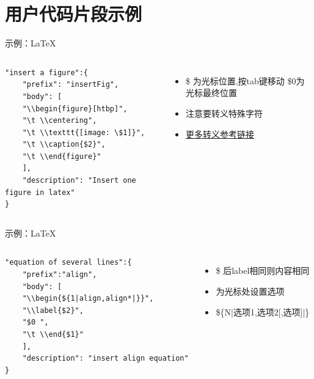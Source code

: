 \documentclass{beamer}
\begin{document}
\section{用户代码片段示例}

\begin{frame}[fragile]{示例：\LaTeX}
    \begin{columns}

        \begin{lstlisting}[language=Tex,basicstyle=\tiny]
    "insert a figure":{
    "prefix": "insertFig",
    "body": [
    "\\begin{figure}[htbp]",
    "\t \\centering",
    "\t \\texttt{[image: \$1]}",
    "\t \\caption{$2}",
    "\t \\end{figure}"
    ],
    "description": "Insert one figure in latex"
}
    \end{lstlisting}

        \begin{itemize}
            \item \$ 为光标位置,按tab键移动 \$0为光标最终位置
            \item 注意要转义特殊字符
            \item  \href{https://www.tutorialspoint.com/json_simple/json_simple_escape_characters.htm}{更多转义参考链接}
        \end{itemize}

    \end{columns}
\end{frame}

\begin{frame}[fragile]{示例：\LaTeX}
    \begin{columns}
        \begin{lstlisting}[language=Tex,basicstyle=\tiny]
"equation of several lines":{
    "prefix":"align",
    "body": [
    "\\begin{${1|align,align*|}}",
    "\\label{$2}",
    "$0 ",
    "\t \\end{$1}"
    ],
    "description": "insert align equation"
}
    \end{lstlisting}

        \begin{itemize}
            \item \$ 后label相同则内容相同
            \item 为光标处设置选项
            \item \$\{N|选项1,选项2[,选项]|\}
        \end{itemize}

    \end{columns}
\end{frame}
\end{document}
